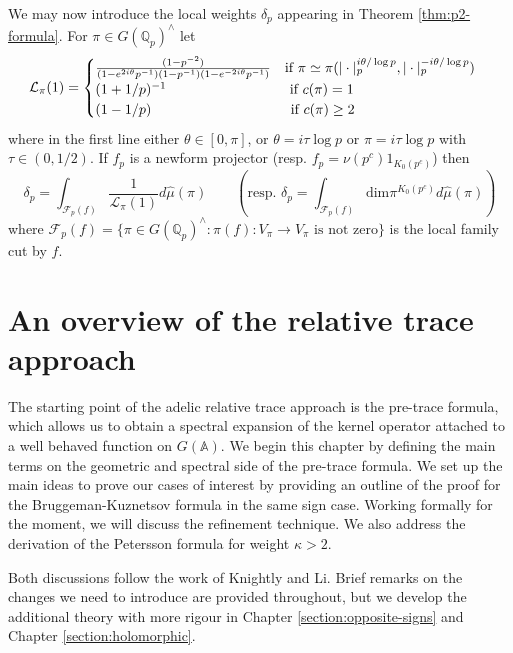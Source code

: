 \documentclass{article}
\numberwithin{equation}{section}
\begin{document}
We may now introduce the local weights $\delta_p$ appearing in Theorem \ref{thm:p2-formula}. For $\pi \in G(\mathbb{Q}_p)^\wedge$ let
\begin{equation}
    \mathcal{L}_\pi(1) =\begin{cases}
        \frac{(1-p^{-2})}{(1-e^{2i\theta}p^{-1})(1-p^{-1})(1-e^{-2i\theta}p^{-1})} \quad \text{if } \pi \simeq \pi(|\cdot|_p^{i\theta/\log p},|\cdot|_p^{-i\theta/\log p}) \\
        (1+1/p)^{-1} \hspace{3.1 cm} \text{if } c(\pi)=1\\
        ( 1-1/p) \hspace{3.5cm} \text{if } c(\pi)\geq 2
    \end{cases}
\end{equation}
where in the first line either $\theta\in[0,\pi]$, or $\theta=i\tau \log p$ or $\pi=i\tau\log p$ with $\tau \in (0,1/2)$.
If $f_p$ is a newform projector (resp. $f_p=\nu(p^c)1_{K_0(p^c)}$) then
\begin{equation}\label{def:local-weights}
    \delta_p= \int_{\mathcal{F}_p(f)}\frac{1}{\mathcal{L}_\pi(1)}d\widehat{\mu}(\pi) \qquad \left(\text{resp. } \delta_p = \int_{\mathcal{F}_p(f)}\text{dim}\pi ^{K_0(p^c)}d\widehat{\mu}(\pi) \right)
\end{equation}
where $\mathcal{F}_p(f)=\{\pi\in G(\mathbb{Q}_p)^\wedge:\pi(f):V_\pi \to V_\pi \text{ is not zero}\}$ is the local family cut by $f$.

\section{An overview of the relative trace approach}
The starting point of the adelic relative trace approach is the pre-trace formula, which allows us to obtain a spectral expansion of the kernel operator attached to a well behaved function on $G(\mathbb{A})$. We begin this chapter by defining the main terms on the geometric and spectral side of the pre-trace formula. We set up the main ideas to prove our cases of interest by providing an outline of the proof for the Bruggeman-Kuznetsov formula in the same sign case. Working formally for the moment, we will discuss the refinement technique. We also address the derivation of the Petersson formula for weight $\kappa>2$. 

Both discussions follow the work of Knightly and Li. Brief remarks on the changes we need to introduce are provided throughout, but we develop the additional theory with more rigour in Chapter \ref{section:opposite-signs} and Chapter \ref{section:holomorphic}.
\end{document}
